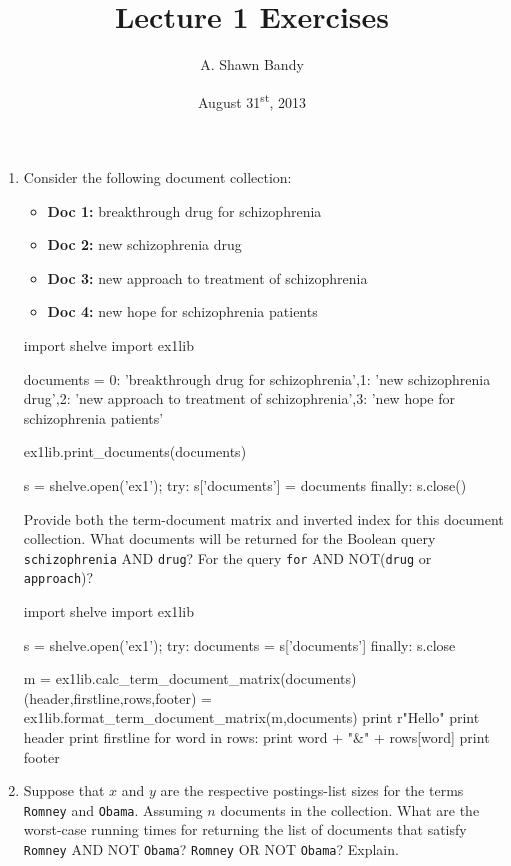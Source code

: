 \documentclass{article}
\begin{document}
\title{Lecture 1 Exercises}
\author{A. Shawn Bandy}
\date{August 31\textsuperscript{st}, 2013}
\maketitle

\begin{enumerate}
\item Consider the following document collection:
\begin{itemize}
\item \textbf{Doc 1:} breakthrough drug for schizophrenia
\item \textbf{Doc 2:} new schizophrenia drug
\item \textbf{Doc 3:} new approach to treatment of schizophrenia
\item \textbf{Doc 4:} new hope for schizophrenia patients
\end{itemize}
\begin{python}[ex1lib.py]
import shelve 
import ex1lib

documents = {0: 'breakthrough drug for schizophrenia',1: 'new schizophrenia drug',2: 'new approach to treatment of schizophrenia',3: 'new hope for schizophrenia patients'}

ex1lib.print_documents(documents)

s = shelve.open('ex1');
try:
	s['documents'] = documents
finally:
	s.close()



\end{python}
Provide both the term-document matrix and inverted index for this document collection.
What documents will be returned for the Boolean query \texttt{schizophrenia} AND
\texttt{drug}? For the query \texttt{for} AND NOT(\texttt{drug} or \texttt{approach})?

\begin{python}
import shelve
import ex1lib

s = shelve.open('ex1');
try:
        documents = s['documents']
finally:
        s.close

m = ex1lib.calc_term_document_matrix(documents)
(header,firstline,rows,footer) = ex1lib.format_term_document_matrix(m,documents)
print r"Hello"
print header
print firstline
for word in rows:
	print word + "&" + rows[word]
print footer
\end{python}



\item Suppose that $x$ and $y$ are the respective postings-list sizes for the terms
\texttt{Romney} and \texttt{Obama}. Assuming $n$ documents in the collection.
What are the worst-case running times for returning the list of documents that satisfy 
\texttt{Romney} AND NOT \texttt{Obama}? \texttt{Romney} OR NOT \texttt{Obama}? 
Explain.


\end{enumerate}
\end{document}
